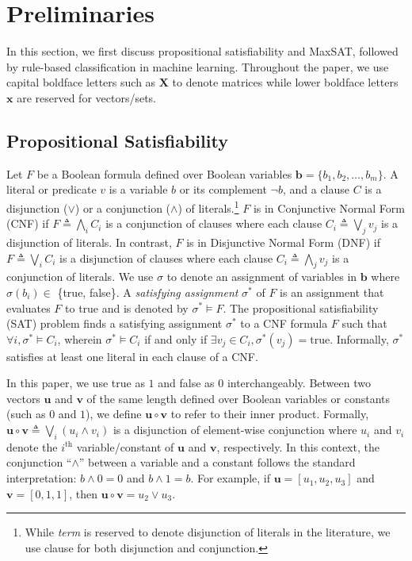 \section{Preliminaries}
\label{interpretability_imli_sec:preliminaries}

In this section, we first discuss propositional satisfiability and MaxSAT, followed by rule-based classification in machine learning. Throughout the paper, we use capital  boldface letters such as $\mathbf{X}$ to denote matrices while lower boldface letters $\mathbf{x}$ are reserved for vectors/sets. 

\subsection{Propositional Satisfiability}

Let $F$ be a Boolean formula defined over Boolean variables $\mathbf{b} = \{b_1,b_2,\dots ,b_m \}$. A literal or predicate $ v $ is a variable $b$ or its complement $\neg b$, and a clause $ C $ is a disjunction ($ \vee $) or a conjunction ($ \wedge $) of literals.\footnote{While \emph{term} is reserved to denote disjunction of literals in the literature, we use clause for both disjunction and conjunction.}  $F$ is in Conjunctive Normal Form (CNF) if $F \triangleq  \bigwedge_i C_i$ is a conjunction of clauses where each clause $C_i \triangleq  \bigvee_j v_j $  is a disjunction of literals. In contrast, $ F $ is in Disjunctive Normal Form (DNF) if $F \triangleq  \bigvee_i C_i$ is a disjunction of clauses where each clause $C_i \triangleq  \bigwedge_j v_j $ is a conjunction of literals. We use $\sigma$ to denote an assignment of variables in  $\mathbf{b}$ where $ \sigma(b_i) \in $ \{true, false\}. A \emph{satisfying assignment} $ \sigma^* $ of $F$ is an assignment  that evaluates $F$  to true and is denoted by $ \sigma^* \models F $. The propositional satisfiability (SAT) problem finds a satisfying assignment $ \sigma^* $ to a CNF formula $ F $  such that $ \forall i, \sigma^* \models C_i $, wherein $ \sigma^*\models C_i $ if and only if $ \exists v_j \in C_i, \sigma^*(v_j) = \text{true} $. Informally, $ \sigma^* $ satisfies at least one literal in each clause of a CNF. 


In this paper, we use true as $ 1 $ and false as $ 0 $ interchangeably. Between two vectors  $\mathbf{u}$ and $\mathbf{v}$ of the same length defined over Boolean variables or constants (such as  $ 0 $ and $ 1 $), we define $\mathbf{u} \circ \mathbf{v} $  to refer to  their inner product. Formally, $\mathbf{u} \circ \mathbf{v} \triangleq \bigvee_{i} (u_{i} \wedge v_{i})$ is a disjunction of element-wise conjunction where $u_{i}$ and $v_{i}$ denote the $ i^\text{th} $ variable/constant of $\mathbf{u}$ and $\mathbf{v}$, respectively. In this context, the conjunction ``$\wedge$'' between a variable and a constant follows the standard interpretation: $b \wedge 0 = 0$ and $b \wedge 1 = b$.  For example, if $ \mathbf{u} = [u_1, u_2, u_3] $ and $ \mathbf{v} = [0,1,1] $, then $ \mathbf{u} \circ \mathbf{v} = u_2 \vee u_3 $.

